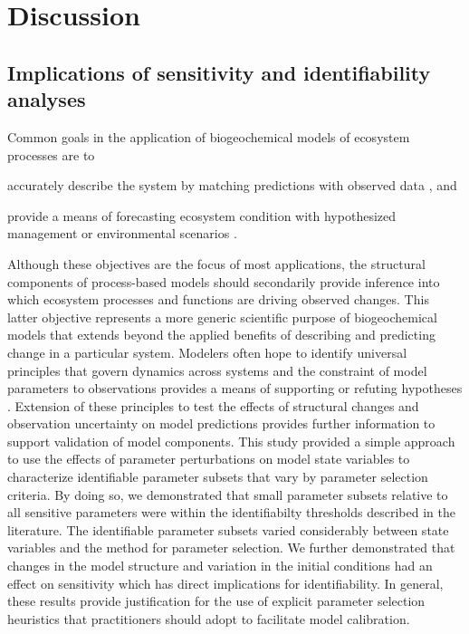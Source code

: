 \documentclass[letterpaper,12pt,oneside]{article}\usepackage[]{graphicx}\usepackage[]{color}
\begin{document}
\section{Discussion}

\subsection{Implications of sensitivity and identifiability analyses}

Common goals in the application of biogeochemical models of ecosystem processes are to \begin{inparaenum}[1\upshape)]
\item accurately describe the system by matching predictions with observed data \citep{Reckhow90}, and 
\item provide a means of forecasting ecosystem condition with hypothesized management or environmental scenarios \citep{Clark01}. 
\end{inparaenum}
Although these objectives are the focus of most applications, the structural components of process-based models should secondarily provide inference into which ecosystem processes and functions are driving observed changes.  This latter objective represents a more generic scientific purpose of biogeochemical models that extends beyond the applied benefits of describing and predicting change in a particular system.  Modelers often hope to identify universal principles that govern dynamics across systems and the constraint of model parameters to observations provides a means of supporting or refuting hypotheses \citep{Kirchner06}.  Extension of these principles to test the effects of structural changes and observation uncertainty on model predictions provides further information to support validation of model components. This study provided a simple approach to use the effects of parameter perturbations on model state variables to characterize identifiable parameter subsets that vary by parameter selection criteria.  By doing so, we demonstrated that small parameter subsets relative to all sensitive parameters were within the identifiabilty thresholds described in the literature.  The identifiable parameter subsets varied considerably between state variables and the method for parameter selection.  We further demonstrated that changes in the model structure and variation in the initial conditions had an effect on sensitivity which has direct implications for identifiability. In general, these results provide justification for the use of explicit parameter selection heuristics that practitioners should adopt to facilitate model calibration.
\end{document}
